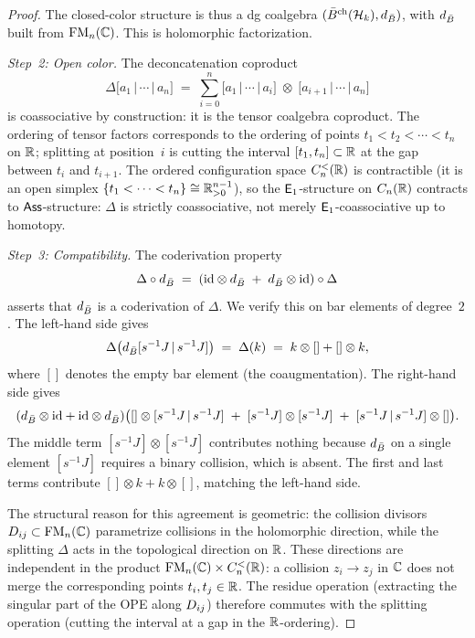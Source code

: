 \begin{proof}
The closed-color structure is thus a dg coalgebra
$(\bar{B}^{\mathrm{ch}}(\mathcal{H}_k), d_{\bar{B}})$, with $d_{\bar{B}}$
built from $\mathrm{FM}_n(\mathbb{C})$.  This is holomorphic factorization.

\medskip
\noindent\textit{Step~2: Open color.}\enspace
The deconcatenation coproduct
\begin{equation}\label{eq:rosetta-delta}
\Delta\bigl[a_1 \,|\, \cdots \,|\, a_n\bigr]
\;=\;
\sum_{i=0}^{n}
\bigl[a_1 \,|\, \cdots \,|\, a_i\bigr]
\;\otimes\;
\bigl[a_{i+1} \,|\, \cdots \,|\, a_n\bigr]
\end{equation}
is coassociative by construction: it is the tensor coalgebra
coproduct.  The ordering of tensor factors corresponds to the
ordering of points $t_1 < t_2 < \cdots < t_n$ on $\mathbb{R}$;
splitting at position~$i$ is cutting the interval
$[t_1, t_n] \subset \mathbb{R}$ at the gap between $t_i$ and $t_{i+1}$.
The ordered configuration space $C_n^{<}(\mathbb{R})$ is
contractible (it is an open simplex
$\{t_1 < \cdots < t_n\} \cong \mathbb{R}^{n-1}_{> 0}$), so the
$\mathsf{E}_1$-structure on $C_n(\mathbb{R})$ contracts to
$\mathsf{Ass}$-structure: $\Delta$ is strictly coassociative,
not merely $\mathsf{E}_1$-coassociative up to homotopy.

\medskip
\noindent\textit{Step~3: Compatibility.}\enspace
The coderivation property
\begin{equation}\label{eq:rosetta-compatibility}
\Delta \circ d_{\bar{B}}
\;=\;
(\mathrm{id} \otimes d_{\bar{B}} \;+\; d_{\bar{B}} \otimes \mathrm{id})
\circ \Delta
\end{equation}
asserts that $d_{\bar{B}}$ is a coderivation of $\Delta$.
We verify this on bar elements of degree~$2$.  The left-hand side
gives
\[
\Delta\bigl(d_{\bar{B}}[s^{-1}J \,|\, s^{-1}J]\bigr)
\;=\;
\Delta(k)
\;=\;
k \otimes [] + [] \otimes k,
\]
where $[]$ denotes the empty bar element (the coaugmentation).
The right-hand side gives
\[
(d_{\bar{B}} \otimes \mathrm{id} + \mathrm{id} \otimes d_{\bar{B}})\bigl(
  [] \otimes [s^{-1}J \,|\, s^{-1}J]
  \;+\;
  [s^{-1}J] \otimes [s^{-1}J]
  \;+\;
  [s^{-1}J \,|\, s^{-1}J] \otimes []
\bigr).
\]
The middle term $[s^{-1}J] \otimes [s^{-1}J]$ contributes nothing
because $d_{\bar{B}}$ on a single element $[s^{-1}J]$ requires a
binary collision, which is absent.  The first and last terms
contribute $[] \otimes k + k \otimes []$, matching the left-hand side.

The structural reason for this agreement is geometric:
the collision divisors $D_{ij} \subset \mathrm{FM}_n(\mathbb{C})$
parametrize collisions in the holomorphic direction, while the
splitting $\Delta$ acts in the topological direction on $\mathbb{R}$.
These directions are independent in the product
$\mathrm{FM}_n(\mathbb{C}) \times C_n^{<}(\mathbb{R})$: a collision
$z_i \to z_j$ in $\mathbb{C}$ does not merge the corresponding
points $t_i, t_j \in \mathbb{R}$.  The residue operation (extracting the
singular part of the OPE along $D_{ij}$) therefore
commutes with the splitting operation (cutting the interval at a
gap in the $\mathbb{R}$-ordering).


\end{proof}
